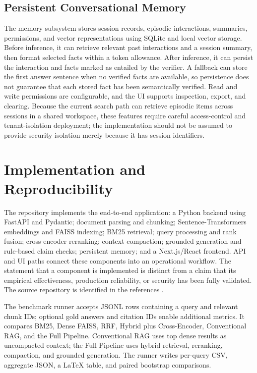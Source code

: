 \documentclass[conference]{IEEEtran}
\begin{document}
\subsection{Persistent Conversational Memory}
The memory subsystem stores session records, episodic interactions, summaries,
permissions, and vector representations using SQLite and local vector
storage. Before inference, it can retrieve relevant past interactions and a
session summary, then format selected facts within a token allowance. After
inference, it can persist the interaction and facts marked as entailed by the
verifier. A fallback can store the first answer sentence when no verified
facts are available, so persistence does not guarantee that each stored fact
has been semantically verified. Read and write permissions are configurable,
and the UI supports inspection, export, and clearing. Because the current
search path can retrieve episodic items across sessions in a shared workspace,
these features require careful access-control and tenant-isolation deployment;
the implementation should not be assumed to provide security isolation
merely because it has session identifiers.

\section{Implementation and Reproducibility}
The repository implements the end-to-end application: a Python backend using
FastAPI and Pydantic; document parsing and chunking; Sentence-Transformers
embeddings and FAISS indexing; BM25 retrieval; query processing and rank
fusion; cross-encoder reranking; context compaction; grounded generation and
rule-based claim checks; persistent memory; and a Next.js/React frontend.
API and UI paths connect these components into an operational workflow. The
statement that a component is implemented is distinct from a claim that its
empirical effectiveness, production reliability, or security has been fully
validated. The source repository is identified in the references
\cite{projectrepository}.

The benchmark runner accepts JSONL rows containing a query and relevant
chunk IDs; optional gold answers and citation IDs enable additional metrics.
It compares BM25, Dense FAISS, RRF, Hybrid plus Cross-Encoder, Conventional
RAG, and the Full Pipeline. Conventional RAG uses top dense results as
uncompacted context; the Full Pipeline uses hybrid retrieval, reranking,
compaction, and grounded generation. The runner writes per-query CSV,
aggregate JSON, a LaTeX table, and paired bootstrap comparisons.
\end{document}
